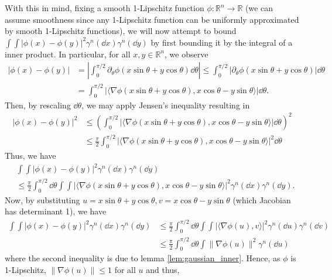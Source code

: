 With this in mind, fixing a smooth 1-Lipschitz function \(\phi : \mathbb{R}^n \to \mathbb{R}\) (we can assume 
smoothness since any 1-Lipschitz function can be uniformly approximated by smooth 1-Lipschitz functions), we will now attempt 
to bound \(\int \int |\phi(x) - \phi(y)|^2 \gamma^n(\dd x) \gamma^n(\dd y)\) by first bounding it by 
the integral of a inner product. In particular, for all \(x, y \in \mathbb{R}^n\), we observe
\begin{align*}
  |\phi(x) - \phi(y)| 
  & = \left|\int_0^{\pi / 2}\partial_\theta \phi(x \sin \theta + y \cos \theta) \dd \theta\right|
    \le \int_0^{\pi / 2}|\partial_\theta \phi(x \sin \theta + y \cos \theta)| \dd\theta\\
  & = \int_0^{\pi / 2} |\langle \nabla \phi(x \sin \theta + y \cos \theta), x \cos \theta - y \sin\theta\rangle| \dd \theta.
\end{align*}
Then, by rescaling \(\dd \theta\), we may apply Jensen's inequality resulting in
\begin{align*}
  |\phi(x) - \phi(y)|^2 
  & \le \left(\int_0^{\pi / 2} |\langle \nabla \phi(x \sin \theta + y \cos \theta), x \cos \theta - y \sin\theta\rangle| \dd \theta\right)^2\\
  & \le \frac{\pi}{2}\int_0^{\pi / 2} |\langle \nabla \phi(x \sin \theta + y \cos \theta), x \cos \theta - y \sin\theta\rangle|^2 \dd \theta
\end{align*}
Thus, we have 
\begin{align*}
  & \int \int |\phi(x) - \phi(y)|^2 \gamma^n(\dd x) \gamma^n(\dd y) \\
  & \le \frac{\pi}{2} \int_0^{\pi / 2} \dd \theta \int \int 
    |\langle \nabla \phi(x \sin \theta + y \cos \theta), x \cos \theta - y \sin\theta\rangle|^2
    \gamma^n(\dd x) \gamma^n(\dd y).
\end{align*}
Now, by substituting \(u = x \sin \theta + y\cos \theta, v = x \cos \theta - y \sin \theta\) (which Jacobian 
has determinant 1), we have
\begin{align*}
  \int \int |\phi(x) - \phi(y)|^2 \gamma^n(\dd x) \gamma^n(\dd y) 
  & \le \frac{\pi}{2} \int_0^{\pi / 2} \dd \theta \int \int |\langle \nabla \phi(u), v \rangle|^2 \gamma^n(\dd u) \gamma^n(\dd v)\\
  & \le \frac{\pi}{2}\int_0^{\pi / 2} \dd \theta \int \|\nabla \phi(u)\|^2 \gamma^n(\dd u)
\end{align*}
where the second inequality is due to lemma \ref{lem:gaussian_inner}. Hence, as \(\phi\) is 1-Lipschitz, 
\(\|\nabla \phi(u)\| \le 1\) for all \(u\) and thus, 
